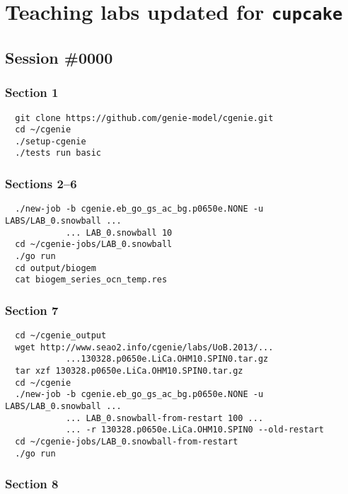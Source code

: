 \documentclass[a4paper,10pt,article]{memoir}
\begin{document}
\appendix
\chapter{Teaching labs updated for \texttt{cupcake}}

\section{Session \#0000}

\subsection*{Section 1}

\begin{verbatim}
  git clone https://github.com/genie-model/cgenie.git
  cd ~/cgenie
  ./setup-cgenie
  ./tests run basic
\end{verbatim}

\subsection*{Sections 2--6}

\begin{verbatim}
  ./new-job -b cgenie.eb_go_gs_ac_bg.p0650e.NONE -u LABS/LAB_0.snowball ...
            ... LAB_0.snowball 10
  cd ~/cgenie-jobs/LAB_0.snowball
  ./go run
  cd output/biogem
  cat biogem_series_ocn_temp.res
\end{verbatim}

\subsection*{Section 7}

\begin{verbatim}
  cd ~/cgenie_output
  wget http://www.seao2.info/cgenie/labs/UoB.2013/...
            ...130328.p0650e.LiCa.OHM10.SPIN0.tar.gz
  tar xzf 130328.p0650e.LiCa.OHM10.SPIN0.tar.gz
  cd ~/cgenie
  ./new-job -b cgenie.eb_go_gs_ac_bg.p0650e.NONE -u LABS/LAB_0.snowball ...
            ... LAB_0.snowball-from-restart 100 ...
            ... -r 130328.p0650e.LiCa.OHM10.SPIN0 --old-restart
  cd ~/cgenie-jobs/LAB_0.snowball-from-restart
  ./go run
\end{verbatim}

\subsection*{Section 8}
\end{document}
